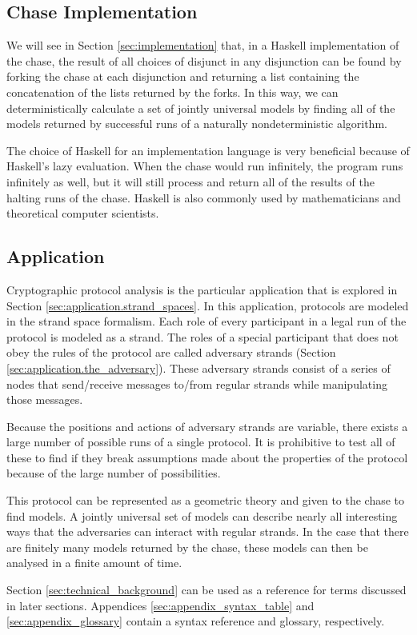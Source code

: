 	\subsection{Chase Implementation}

		We will see in Section \ref{sec:implementation} that, in a Haskell
		implementation of the chase, the result of all choices of disjunct in
		any disjunction can be found by forking the chase at each disjunction
		and returning a list containing the concatenation of the lists returned
		by the forks. In this way, we can deterministically calculate a set of
		jointly universal models by finding all of the models returned by
		successful runs of a naturally nondeterministic algorithm.

		The choice of Haskell for an implementation language is very beneficial
		because of Haskell's lazy evaluation. When the chase would run
		infinitely, the program runs infinitely as well, but it will still
		process and return all of the results of the halting runs of the chase.
		Haskell is also commonly used by mathematicians and theoretical
		computer scientists.

	\subsection{Application}

		Cryptographic protocol analysis is the particular application that is
		explored in Section \ref{sec:application.strand_spaces}. In this
		application, protocols are modeled in the strand space formalism. Each
		role of every participant in a legal run of the protocol is modeled as
		a strand. The roles of a special participant that does not obey the
		rules of the protocol are called adversary strands (Section
		\ref{sec:application.the_adversary}). These adversary strands consist
		of a series of nodes that send/receive messages to/from regular strands
		while manipulating those messages.

		Because the positions and actions of adversary strands are variable,
		there exists a large number of possible runs of a single protocol. It
		is prohibitive to test all of these to find if they break assumptions
		made about the properties of the protocol because of the large number
		of possibilities.

		This protocol can be represented as a geometric theory and given to the
		chase to find models. A jointly universal set of models can describe
		nearly all interesting ways that the adversaries can interact with
		regular strands. In the case that there are finitely many models
		returned by the chase, these models can then be analysed in a finite
		amount of time.

	Section \ref{sec:technical_background} can be used as a reference for terms
	discussed in later sections. Appendices \ref{sec:appendix_syntax_table} and
	\ref{sec:appendix_glossary} contain a syntax reference and glossary,
	respectively.
